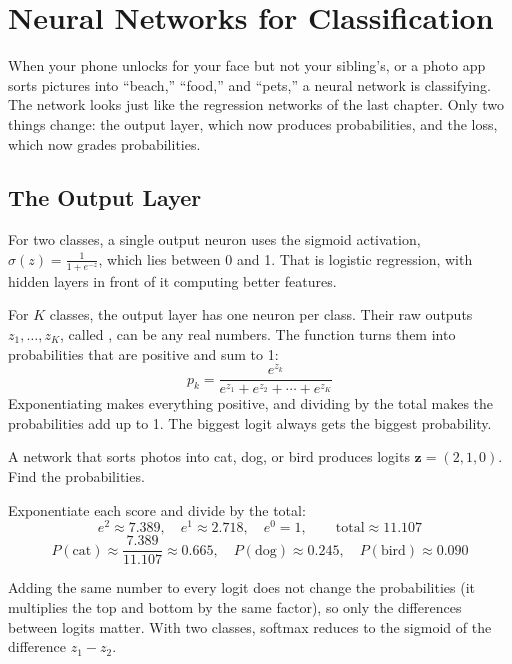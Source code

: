 \chapter{Neural Networks for Classification}

When your phone unlocks for your face but not your sibling's, or a photo app sorts pictures into ``beach,''
``food,'' and ``pets,'' a neural network is classifying. The network looks just like the regression networks of the
last chapter. Only two things change: the output layer, which now produces probabilities, and the loss, which now
grades probabilities.

\section{The Output Layer}
For two classes, a single output neuron uses the sigmoid activation, $\sigma(z) = \frac{1}{1 + e^{-z}}$, which lies
between 0 and 1. That is logistic regression, with hidden layers in front of it computing better features.

For $K$ classes, the output layer has one neuron per class. Their raw outputs $z_1, \ldots, z_K$, called
, can be any real numbers. The  function turns them into
probabilities that are positive and sum to 1:
$$p_k = \frac{e^{z_k}}{e^{z_1} + e^{z_2} + \cdots + e^{z_K}}$$
Exponentiating makes everything positive, and dividing by the total makes the probabilities add up to 1. The
biggest logit always gets the biggest probability.

\begin{Worked}
\begin{Problem}
A network that sorts photos into cat, dog, or bird produces logits $\mathbf{z} = (2, 1, 0)$.
Find the probabilities.
\end{Problem}
\begin{Solution}
Exponentiate each score and divide by the total:
$$e^2 \approx 7.389, \quad e^1 \approx 2.718, \quad e^0 = 1, \qquad \text{total} \approx 11.107$$
$$P(\text{cat}) \approx \frac{7.389}{11.107} \approx 0.665, \quad P(\text{dog}) \approx 0.245, \quad
P(\text{bird}) \approx 0.090$$
\end{Solution}
\end{Worked}

Adding the same number to every logit does not change the probabilities (it multiplies the top and bottom by the
same factor), so only the differences between logits matter. With two classes, softmax reduces to the sigmoid of
the difference $z_1 - z_2$.

